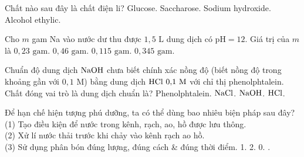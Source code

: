 \documentclass[12pt,a4paper]{article}
\begin{document}
\begin{ex}
Chất nào sau đây là chất điện li?
\choice
{Glucose.}
{Saccharose.}
{\True Sodium hydroxide.}
{Alcohol ethylic.}
\end{ex}

\begin{ex}
Cho $m$ gam Na vào nước dư thu được $1{,}5\text{ L}$ dung dịch có $\text{pH} = 12$. Giá trị của $m$ là
\choice
{$0{,}23\text{ gam}$.}
{$0{,}46\text{ gam}$.}
{$0{,}115\text{ gam}$.}
{\True $0{,}345\text{ gam}$.}
\end{ex}

\begin{ex}
Chuẩn độ dung dịch $\ce{NaOH}$ chưa biết chính xác nồng độ (biết nồng độ trong khoảng gần với $0{,}1\text{ M}$) bằng dung dịch $\ce{HCl}\ 0{,}1\text{ M}$ với chỉ thị phenolphtalein. Chất đóng vai trò là dung dịch chuẩn là?
\choice
{Phenolphtalein.}
{$\ce{NaCl}$.}
{$\ce{NaOH}$.}
{\True $\ce{HCl}$.}
\end{ex}

\begin{ex}
Để hạn chế hiện tượng phú dưỡng, ta có thể dùng bao nhiêu biện pháp sau đây?\\
(1) Tạo điều kiện để nước trong kênh, rạch, ao, hồ được lưu thông.\\
(2) Xử lí nước thải trước khi chảy vào kênh rạch ao hồ.\\
(3) Sử dụng phân bón đúng lượng, đúng cách \& đúng thời điểm.
\choice
{1.}
{2.}
{0.}
{.}
\end{ex}
\end{document}
